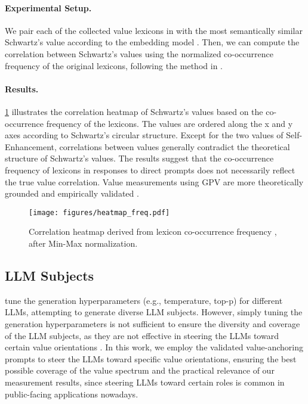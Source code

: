 \paragraph{Experimental Setup.}
We pair each of the collected value lexicons in \cite{biedma2024beyond} with the most semantically similar Schwartz's value according to the embedding model \cite{openai2024textembedding3large}. Then, we can compute the correlation between Schwartz's values using the normalized co-occurrence frequency of the original lexicons, following the method in \cite{biedma2024beyond}.

\paragraph{Results.}
\cref{fig:heatmap} illustrates the correlation heatmap of Schwartz's values based on the co-occurrence frequency of the lexicons. The values are ordered along the x and y axes according to Schwartz's circular structure. Except for the two values of Self-Enhancement, correlations between values generally contradict the theoretical structure of Schwartz's values. The results suggest that the co-occurrence frequency of lexicons in responses to direct prompts does not necessarily reflect the true value correlation. Value measurements using GPV are more theoretically grounded and empirically validated \cite{ye2025gpv}.

\begin{figure}[h]
    \centering
    \texttt{[image: figures/heatmap\_freq.pdf]}
    \caption{Correlation heatmap derived from lexicon co-occurrence frequency \cite{biedma2024beyond}, after Min-Max normalization.}
    \label{fig:heatmap}
\end{figure}


\subsection{LLM Subjects}

\citet{biedma2024beyond} tune the generation hyperparameters (e.g., temperature, top-p) for different LLMs, attempting to generate diverse LLM subjects. However, simply tuning the generation hyperparameters is not sufficient to ensure the diversity and coverage of the LLM subjects, as they are not effective in steering the LLMs toward certain value orientations \cite{rozen2024llms}. In this work, we employ the validated value-anchoring prompts \cite{rozen2024llms} to steer the LLMs toward specific value orientations, ensuring the best possible coverage of the value spectrum and the practical relevance of our measurement results, since steering LLMs toward certain roles is common in public-facing applications nowadays.